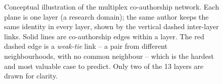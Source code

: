 \begin{figure}[htbp]
\caption{Conceptual illustration of the multiplex co-authorship network. Each plane is one layer (a
research domain); the same author keeps the same identity in every layer, shown by the vertical
dashed inter-layer links. Solid lines are co-authorship edges within a layer. The red dashed edge is
a \emph{weak-tie} link -- a pair from different neighbourhoods, with no common neighbour -- which is
the hardest and most valuable case to predict. Only two of the 13 layers are drawn for clarity.}
\label{fig:multiplex-concept}
\end{figure}
